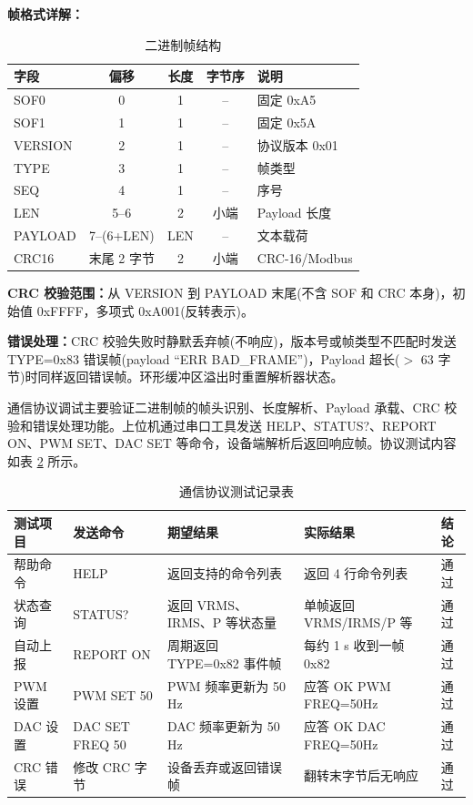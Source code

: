 \documentclass[UTF8,a4paper,zihao=-4,fontset=macnew]{ctexart}
\begin{document}
\textbf{帧格式详解：}

\begin{table}[H]
\centering
{}
\caption{二进制帧结构}
\label{tab:frame-struct}
\begin{tabular}{lcccl}
\toprule
字段 & 偏移 & 长度 & 字节序 & 说明 \\
\midrule
SOF0 & 0 & 1 & -- & 固定 0xA5 \\
SOF1 & 1 & 1 & -- & 固定 0x5A \\
VERSION & 2 & 1 & -- & 协议版本 0x01 \\
TYPE & 3 & 1 & -- & 帧类型 \\
SEQ & 4 & 1 & -- & 序号 \\
LEN & 5--6 & 2 & 小端 & Payload 长度 \\
PAYLOAD & 7--(6+LEN) & LEN & -- & 文本载荷 \\
CRC16 & 末尾 2 字节 & 2 & 小端 & CRC-16/Modbus \\
\bottomrule
\end{tabular}
\end{table}

\textbf{CRC 校验范围：}从 VERSION 到 PAYLOAD 末尾(不含 SOF 和 CRC 本身)，初始值 0xFFFF，多项式 0xA001(反转表示)。

\textbf{错误处理：}CRC 校验失败时静默丢弃帧(不响应)，版本号或帧类型不匹配时发送 TYPE=0x83 错误帧(payload ``ERR BAD\_FRAME'')，Payload 超长($>$ 63 字节)时同样返回错误帧。环形缓冲区溢出时重置解析器状态。

通信协议调试主要验证二进制帧的帧头识别、长度解析、Payload 承载、CRC 校验和错误处理功能。上位机通过串口工具发送 HELP、STATUS?、REPORT ON、PWM SET、DAC SET 等命令，设备端解析后返回响应帧。协议测试内容如表 \ref{tab:protocol-test} 所示。

\begin{table}[H]
\centering
{}
\caption{通信协议测试记录表}
\label{tab:protocol-test}
\begin{tabular}{lllll}
\toprule
测试项目 & 发送命令 & 期望结果 & 实际结果 & 结论 \\
\midrule
帮助命令 & HELP & 返回支持的命令列表 & 返回 4 行命令列表 & 通过 \\
状态查询 & STATUS? & 返回 VRMS、IRMS、P 等状态量 & 单帧返回 VRMS/IRMS/P 等 & 通过 \\
自动上报 & REPORT ON & 周期返回 TYPE=0x82 事件帧 & 每约 1 s 收到一帧 0x82 & 通过 \\
PWM 设置 & PWM SET 50 & PWM 频率更新为 50 Hz & 应答 OK PWM FREQ=50Hz & 通过 \\
DAC 设置 & DAC SET FREQ 50 & DAC 频率更新为 50 Hz & 应答 OK DAC FREQ=50Hz & 通过 \\
CRC 错误 & 修改 CRC 字节 & 设备丢弃或返回错误帧 & 翻转末字节后无响应 & 通过 \\
\bottomrule
\end{tabular}
\end{table}
\end{document}

